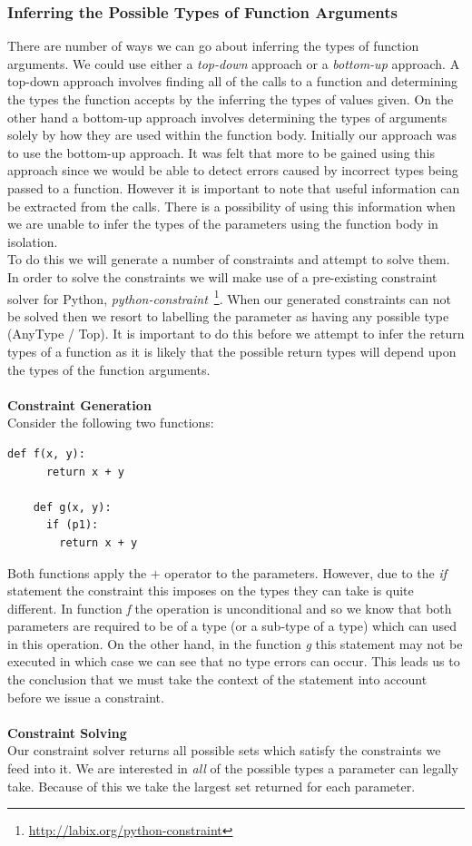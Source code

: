 \documentclass[12pt, titlepage]{article}
\begin{document}
\subsubsection{Inferring the Possible Types of Function Arguments}
There are number of ways we can go about inferring the types of function arguments. We could use either a \textit{top-down} approach or a \textit{bottom-up} approach. A top-down approach involves finding all of the calls to a function and determining the types the function accepts by the inferring the types of values given. On the other hand a bottom-up approach involves determining the types of arguments solely by how they are used within the function body. Initially our approach was to use the bottom-up approach. It was felt that more to be gained using this approach since we would be able to detect errors caused by incorrect types being passed to a function. However it is important to note that useful information can be extracted from the calls. There is a possibility of using this information when we are unable to infer the types of the parameters using the function body in isolation. \\
To do this we will generate a number of constraints and attempt to solve them. In order to solve the constraints we will make use of a pre-existing constraint solver for Python, \textit{python-constraint}~\footnote{\url{http://labix.org/python-constraint}}. When our generated constraints can not be solved then we resort to labelling the parameter as having any possible type (AnyType / Top).
It is important to do this before we attempt to infer the return types of a function as it is likely that the possible return types will depend upon the types of the function arguments. \\\\
\textbf{Constraint Generation} \\
Consider the following two functions:
\begin{lstlisting}[mathescape]
	def f(x, y):
	  return x + y
		
	def g(x, y):
	  if (p1):
	    return x + y
\end{lstlisting}
Both functions apply the $+$ operator to the parameters. However, due to the \textit{if} statement the constraint this imposes on the types they can take is quite different. In function \textit{f} the operation is unconditional and so we know that both parameters are required to be of a type (or a sub-type of a type) which can used in this operation. On the other hand, in the function \textit{g} this statement may not be executed in which case we can see that no type errors can occur. This leads us to the conclusion that we must take the context of the statement into account before we issue a constraint.
\\\\
\textbf{Constraint Solving} \\
Our constraint solver returns all possible sets which satisfy the constraints we feed into it. We are interested in \textit{all} of the possible types a parameter can legally take. Because of this we take the largest set returned for each parameter.
\end{document}
